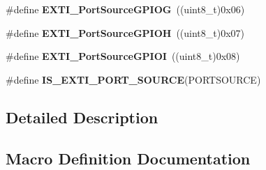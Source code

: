 \begin{DoxyCompactItemize}
\item 
\hypertarget{group___s_y_s_c_f_g___e_x_t_i___port___sources_gab21c24889233b24373a471222e85b950}{}\#define {\bfseries E\+X\+T\+I\+\_\+\+Port\+Source\+G\+P\+I\+O\+G}~((uint8\+\_\+t)0x06)\label{group___s_y_s_c_f_g___e_x_t_i___port___sources_gab21c24889233b24373a471222e85b950}

\item 
\hypertarget{group___s_y_s_c_f_g___e_x_t_i___port___sources_gaf7fb8bbfc4d796b92df64e41a2c44dc6}{}\#define {\bfseries E\+X\+T\+I\+\_\+\+Port\+Source\+G\+P\+I\+O\+H}~((uint8\+\_\+t)0x07)\label{group___s_y_s_c_f_g___e_x_t_i___port___sources_gaf7fb8bbfc4d796b92df64e41a2c44dc6}

\item 
\hypertarget{group___s_y_s_c_f_g___e_x_t_i___port___sources_ga9f57956fd533afa9b5d323601842c74e}{}\#define {\bfseries E\+X\+T\+I\+\_\+\+Port\+Source\+G\+P\+I\+O\+I}~((uint8\+\_\+t)0x08)\label{group___s_y_s_c_f_g___e_x_t_i___port___sources_ga9f57956fd533afa9b5d323601842c74e}

\item 
\#define {\bfseries I\+S\+\_\+\+E\+X\+T\+I\+\_\+\+P\+O\+R\+T\+\_\+\+S\+O\+U\+R\+C\+E}(P\+O\+R\+T\+S\+O\+U\+R\+C\+E)
\end{DoxyCompactItemize}


\subsection{Detailed Description}


\subsection{Macro Definition Documentation}
\hypertarget{group___s_y_s_c_f_g___e_x_t_i___port___sources_gaec9c6d2a4276fc14c4e147631a0efe92}{}
